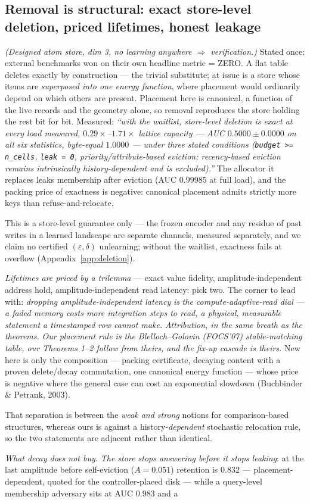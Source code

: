 \documentclass{article}
\begin{document}
\subsection{Removal is structural: exact store-level deletion, priced lifetimes, honest leakage}\label{sec:deletion}

\emph{(Designed atom store, dim 3, no learning anywhere $\Rightarrow$ verification.)} Stated once: external benchmarks won on their own headline metric = ZERO. A flat table deletes exactly by construction --- the trivial substitute; at issue is a store whose items are \emph{superposed into one energy function}, where placement would ordinarily depend on which others are present. Placement here is canonical, a function of the live records and the geometry alone, so removal reproduces the store holding the rest bit for bit. Measured: \emph{``with the waitlist, store-level deletion is exact at every load measured, $0.29\times$--$1.71\times$ lattice capacity --- AUC $0.5000\pm0.0000$ on all six statistics, byte-equal $1.0000$ --- under three stated conditions (\texttt{budget >= n\_cells}, \texttt{leak = 0}, priority/attribute-based eviction; recency-based eviction remains intrinsically history-dependent and is excluded).''} The allocator it replaces leaks membership after eviction (AUC $0.99985$ at full load), and the packing price of exactness is negative: canonical placement admits strictly more keys than refuse-and-relocate. {\footnotesize This is a store-level guarantee only --- the frozen encoder and any residue of past writes in a learned landscape are separate channels, measured separately, and we claim no certified $(\varepsilon,\delta)$ unlearning; without the waitlist, exactness fails at overflow (Appendix~\ref{app:deletion}).\par} \emph{Lifetimes are priced by a trilemma} --- exact value fidelity, amplitude-independent address hold, amplitude-independent read latency: pick two. The corner to lead with: \emph{dropping amplitude-independent latency} \emph{is} \emph{the compute-adaptive-read dial --- a faded memory costs more integration steps to read, a physical, measurable statement a timestamped row cannot make.} \emph{Attribution, in the same breath as the theorems.} \emph{Our placement rule is the Blelloch--Golovin (FOCS'07) stable-matching table, our Theorems 1--2 follow from theirs, and the fix-up cascade is theirs.} New here is only the composition --- packing certificate, decaying content with a proven delete/decay commutation, one canonical energy function --- whose price is negative where the general case can cost an exponential slowdown (Buchbinder \& Petrank, 2003). {\footnotesize That separation is between the \emph{weak and strong} notions for comparison-based structures, whereas ours is against a history-\emph{dependent} stochastic relocation rule, so the two statements are adjacent rather than identical.\par} \emph{What decay does not buy.} \emph{The store stops answering before it stops leaking}: at the last amplitude before self-eviction ($A=0.051$) retention is $0.832$ --- placement-dependent, quoted for the controller-placed disk --- while a query-level membership adversary sits at AUC $0.983$ and a 
\end{document}
